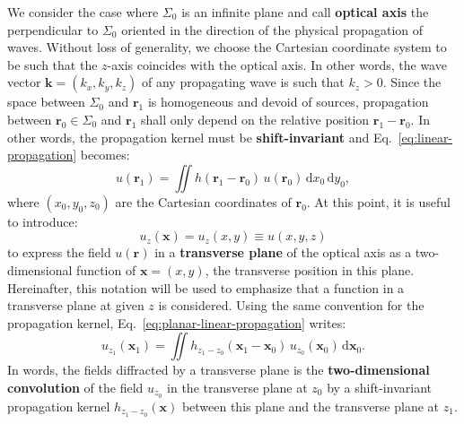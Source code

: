 \documentclass[a4paper]{article}
\newcommand{\V}[1]{\boldsymbol{#1}}
\newcommand*{\mathd}{\mathrm{d}}
\begin{document}
We consider the case where $\Sigma_{0}$ is an infinite plane and call
\textbf{optical axis} the perpendicular to $\Sigma_{0}$ oriented in the
direction of the physical propagation of waves. Without loss of generality, we
choose the Cartesian coordinate system to be such that the $z$-axis coincides
with the optical axis. In other words, the wave vector
$\V{k} = (k_{x},k_{y},k_{z})$ of any propagating wave is such that $k_{z} > 0$.
Since the space between $\Sigma_{0}$ and $\V{r}_{1}$ is homogeneous and devoid
of sources, propagation between $\V{r}_{0} ∈ \Sigma_{0}$ and $\V{r}_{1}$ shall
only depend on the relative position $\V{r}_{1} - \V{r}_{0}$. In other words,
the propagation kernel must be \textbf{shift-invariant} and
Eq.~\eqref{eq:linear-propagation} becomes:
\begin{equation}
  \label{eq:planar-linear-propagation}
  u(\V{r}_{1}) = \iint h(\V{r}_{1} - \V{r}_{0})\,u(\V{r}_{0})\,\mathd x_{0}\,\mathd y_{0},
\end{equation}
where $(x_{0},y_{0},z_{0})$ are the Cartesian coordinates of $\V{r}_{0}$. At
this point, it is useful to introduce:
\begin{equation}
  \label{eq:u_z}
  u_{z}(\V{x}) = u_{z}(x,y) ≡ u(x,y,z)
\end{equation}
to express the field $u(\V{r})$ in a \textbf{transverse plane} of the optical
axis as a two-dimensional function of $\V{x} = (x,y)$, the transverse position
in this plane. Hereinafter, this notation will be used to emphasize that a
function in a transverse plane at given $z$ is considered. Using the same
convention for the propagation kernel, Eq.~\eqref{eq:planar-linear-propagation}
writes:
\begin{equation}
  \label{eq:convolutive-propagation}
  u_{z_{1}}(\V{x}_{1}) =
  \iint h_{z_{1} - z_{0}}(\V{x}_{1} - \V{x}_{0})\,
  u_{z_{0}}(\V{x}_{0})\,\mathd\V{x}_{0}.
\end{equation}
In words, the fields diffracted by a transverse plane is the
\textbf{two-dimensional convolution} of the field $u_{z_{0}}$ in the transverse
plane at $z_{0}$ by a shift-invariant propagation kernel
$h_{z_{1} - z_{0}}(\V{x})$ between this plane and the transverse plane at
$z_{1}$.
\end{document}
